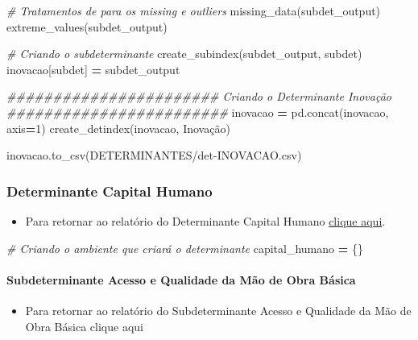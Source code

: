 \documentclass[
  12,
  dvipsnames]{article}
\newenvironment{Shaded}{\begin{snugshade}}{\end{snugshade}}
\newcommand{\CommentTok}[1]{\textcolor[rgb]{0.56,0.35,0.01}{\textit{#1}}}
\newcommand{\DecValTok}[1]{\textcolor[rgb]{0.00,0.00,0.81}{#1}}
\newcommand{\NormalTok}[1]{#1}
\newcommand{\OperatorTok}[1]{\textcolor[rgb]{0.81,0.36,0.00}{\textbf{#1}}}
\newcommand{\StringTok}[1]{\textcolor[rgb]{0.31,0.60,0.02}{#1}}
\providecommand{\tightlist}{%
  \setlength{\itemsep}{0pt}\setlength{\parskip}{0pt}}
\begin{document}
\begin{Shaded}
\begin{Highlighting}[]
\CommentTok{\# Tratamentos de para os missing e outliers}
\NormalTok{missing\_data(subdet\_output)}
\NormalTok{extreme\_values(subdet\_output)}

\CommentTok{\# Criando o subdeterminante}
\NormalTok{create\_subindex(subdet\_output, subdet)}
\NormalTok{inovacao[subdet] }\OperatorTok{=}\NormalTok{ subdet\_output}

\CommentTok{\#\#\#\#\#\#\#\#\#\#\#\#\#\#\#\#\#\#\#\#\#\#\# Criando o Determinante Inovação \#\#\#\#\#\#\#\#\#\#\#\#\#\#\#\#\#\#\#\#\#\#\#\#}
\NormalTok{inovacao }\OperatorTok{=}\NormalTok{ pd.concat(inovacao, axis}\OperatorTok{=}\DecValTok{1}\NormalTok{)}
\NormalTok{create\_detindex(inovacao, }\StringTok{\textquotesingle{}Inovação\textquotesingle{}}\NormalTok{)}

\NormalTok{inovacao.to\_csv(}\StringTok{\textquotesingle{}DETERMINANTES/det{-}INOVACAO.csv\textquotesingle{}}\NormalTok{)}
\end{Highlighting}
\end{Shaded}

\hypertarget{script_2.6}{%
\subsubsection*{Determinante Capital Humano}\label{script_2.6}}

\begin{itemize}
\tightlist
\item
  Para retornar ao relatório do Determinante Capital Humano
  \protect\hyperlink{det_capital_humano}{clique aqui}.
\end{itemize}

\begin{Shaded}
\begin{Highlighting}[]
\CommentTok{\# Criando o ambiente que criará o determinante}
\NormalTok{capital\_humano }\OperatorTok{=}\NormalTok{ \{\}}
\end{Highlighting}
\end{Shaded}

\hypertarget{script_2.6.1}{%
\paragraph*{Subdeterminante Acesso e Qualidade da Mão de Obra
Básica}\label{script_2.6.1}}

\begin{itemize}
\tightlist
\item
  Para retornar ao relatório do Subdeterminante Acesso e Qualidade da
  Mão de Obra Básica \protect\hypertarget{subdet_obra_basica}{}{clique
  aqui}
\end{itemize}
\end{document}
